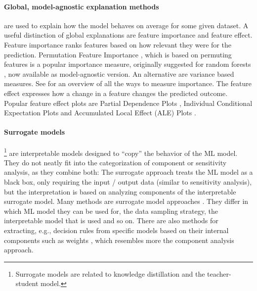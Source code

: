 \documentclass[runningheads]{llncs}
\begin{document}
\paragraph{Global, model-agnostic explanation methods} are used to explain how the model behaves on average for some given dataset.
A useful distinction of global explanations are feature importance and feature effect.
Feature importance ranks features based on how relevant they were for the prediction.
Permutation Feature Importance \cite{fisher2019all}, which is based on permuting features is a popular importance measure, originally suggested for random forests \cite{breiman2001random}, now available as model-agnostic version.
An alternative are variance based measures.
See \cite{wei2015variable} for an overview of all the ways to measure importance.
The feature effect expresses how a change in a feature changes the predicted outcome.
Popular feature effect plots are Partial Dependence Plots \cite{friedman2001greedy}, Individual Conditional Expectation Plots \cite{goldstein2015peeking} and Accumulated Local Effect  (ALE)  Plots \cite{apley2016visualizing}.

\paragraph{Surrogate models}\footnote{Surrogate models are related to knowledge distillation and the teacher-student model.} are interpretable models designed to \enquote{copy} the behavior of the ML model.
They do not neatly fit into the categorization of component or sensitivity analysis, as they combine both:
The surrogate approach treats the ML model as a black box, only requiring the input / output data  (similar to sensitivity analysis), but the interpretation is based on analyzing components of the interpretable surrogate model.
Many methods are surrogate model approaches \cite{puri2017magix,molnar2019,ming2018rulematrix,ribeiro2016should,frosst2017distilling,bastani2017interpreting,craven1996extracting,krishnan2017palm}.
They differ in which ML model they can be used for, the data sampling strategy, the interpretable model that is used and so on.
There are also methods for extracting, e.g., decision rules from specific models based on their internal components such as weights \cite{andrews1995survey,augasta2012rule}, which resembles more the component analysis approach.

\end{document}
